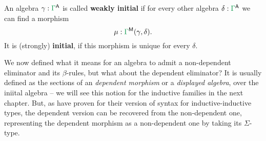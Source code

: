 \begin{defn}
An algebra $\gamma : \grm{\Gamma}^\CC$ is called \textbf{weakly initial} if
for every other algebra $\delta : \grm{\Gamma}^\CC$ we can find a morphism
\begin{equation*}
\mu : \grm{\Gamma}^\MM(\gamma, \delta) \text{.}
\end{equation*}
It is (strongly) \textbf{initial}, if this morphism is unique for every $\delta$.
\end{defn}

\begin{remark}
We now defined what it means for an algebra to admit a non-dependent eliminator
and its $\beta$-rules, but what about the dependent eliminator?
It is usually defined as the sections of an \emph{dependent morphism}
or a \emph{displayed algebra},
over the iniital algebra -- we will see this notion for the inductive families in the
next chapter.
But, as \citet{foo} have proven for their version of syntax for inductive-inductive
types, the dependent version can be recovered from the non-dependent one,
representing the dependent morphism as a non-dependent one by
taking its $\Sigma$-type.
\end{remark}















